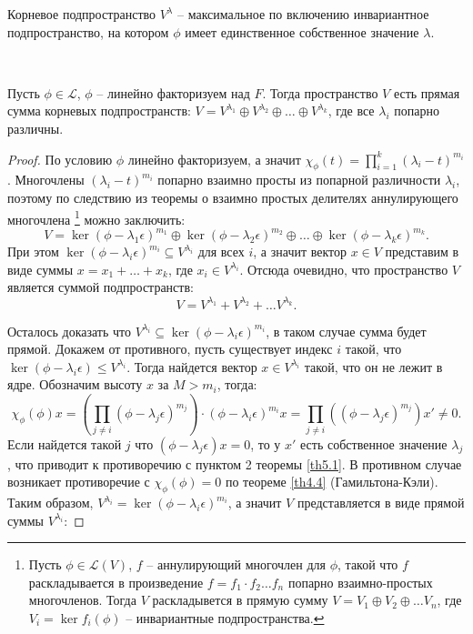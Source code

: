 \begin{corollary}
    Корневое подпространство $V^{\lambda}$ -- максимальное по включению инвариантное подпространство, 
    на котором $\phi$ имеет единственное собственное значение $\lambda$.
\end{corollary}

\begin{theorem}~
    \label{th5.2}

    Пусть $\phi \in \mathcal{L}$, $\phi$ -- линейно факторизуем над $F$.
    Тогда пространство $V$ есть прямая сумма корневых подпространств: 
    $V = V^{\lambda_1} \oplus V^{\lambda_2} \oplus \ldots \oplus V^{\lambda_k}$, где все $\lambda_i$ попарно различны.
\end{theorem}

\begin{proof}
    По условию $\phi$ линейно факторизуем, а значит
    $\chi_{\phi}(t) = \displaystyle\prod_{i= 1}^{k} (\lambda_i - t)^{m_i}$. Многочлены $(\lambda_i - t)^{m_i}$ попарно взаимно просты 
    из попарной различности $\lambda_i$, поэтому по следствию из теоремы о взаимно простых делителях аннулирующего многочлена \footnote{Пусть $\phi \in \mathcal{L}(V)$, $f$ -- аннулирующий многочлен для $\phi$, такой что $f$ 
    раскладывается в произведение $f = f_1 \cdot f_2 \dots f_n$ попарно взаимно-простых многочленов.
    Тогда $V$ раскладывется в прямую сумму $V = V_1 \oplus V_2 \oplus \dots V_n$, 
    где $V_i = \ker f_i(\phi)$ -- инвариантные подпространства.} можно заключить:
    $$V = \ker (\phi - \lambda_1 \epsilon)^{m_1} \oplus \ker (\phi - \lambda_2 \epsilon)^{m_2} 
    \oplus \dots \oplus \ker (\phi - \lambda_k \epsilon)^{m_k}.$$
    При этом $\ker (\phi - \lambda_i \epsilon)^{m_i} \subseteq V^{\lambda_i}$ для всех $i$,
    а значит вектор $x \in V$ представим в виде суммы 
    $x = x_1 + \ldots + x_k$, где $x_i \in V^{\lambda_i}$.
    Отсюда очевидно, что пространство $V$ является суммой подпространств: 
    $$V = V^{\lambda_1} + V^{\lambda_2} + \dots V^{\lambda_k}.$$ 
    
    Осталось доказать что $V^{\lambda_i} \subseteq \ker(\phi - \lambda_i \epsilon)^{m_i}$, 
    в таком случае сумма будет прямой. Докажем от противного, пусть существует индекс $i$ такой, 
    что $\ker (\phi - \lambda_i \epsilon) \leq V^{\lambda_i}$. Тогда найдется вектор 
    $x \in V^{\lambda_i}$ такой, что он не лежит в ядре. Обозначим высоту $x$ за $M > m_i$, тогда:
    $$\chi_{\phi}(\phi) x = \left(\displaystyle\prod_{j \neq i} (\phi - \lambda_j \epsilon)^{m_j}\right) \cdot 
    (\phi - \lambda_i \epsilon)^{m_i} x = \displaystyle\prod_{j \neq i} 
    ((\phi - \lambda_j \epsilon)^{m_j})x' \neq 0.$$ 
    Если найдется такой $j$ что $(\phi - \lambda_j \epsilon)x = 0$, то у $x'$ есть собственное значение
    $\lambda_j$, что приводит к противоречию с пунктом 2 теоремы \ref{th5.1}. 
    В противном случае возникает противоречие с 
    $\chi_{\phi}(\phi) = 0$ по теореме \ref{th4.4} (Гамильтона-Кэли). 
    Таким образом, $V^{\lambda_i} = \ker(\phi - \lambda_i \epsilon)^{m_i}$, а значит $V$ представляется 
    в виде прямой суммы $V^{\lambda_i}$:


\end{proof}
